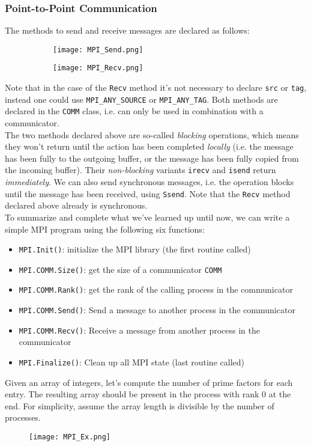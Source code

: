 \documentclass[main]{subfiles}
\begin{document}
\subsubsection{Point-to-Point Communication}
The methods to send and receive messages are declared as follows:
\begin{figure}[H]
    \centering
    \begin{subfigure}{.5\textwidth}
        \centering
        \texttt{[image: MPI\_Send.png]}
    \end{subfigure}%
    \begin{subfigure}{.5\textwidth}
        \centering
        \texttt{[image: MPI\_Recv.png]}
    \end{subfigure}
\end{figure}
Note that in the case of the \texttt{Recv} method it's not necessary to declare \texttt{src} or \texttt{tag}, instead one could use \texttt{MPI\_ANY\_SOURCE} or \texttt{MPI\_ANY\_TAG}. Both methods are declared in the \texttt{COMM} class, i.e. can only be used in combination with a communicator.\\[3mm]
The two methods declared above are so-called \textit{blocking} operations, which means they won't return until the action has been completed \textit{locally} (i.e. the message has been fully to the outgoing buffer, or the message has been fully copied from the incoming buffer). Their \textit{non-blocking} variants \texttt{irecv} and \texttt{isend} return \textit{immediately}. We can also send synchronous messages, i.e. the operation blocks until the message has been received, using \texttt{Ssend}. Note that the \texttt{Recv} method declared above already is synchronous.\\[3mm]
To summarize and complete what we've learned up until now, we can write a simple MPI program using the following six functions:
\begin{itemize}
    \item \texttt{MPI.Init()}: initialize the MPI library (the first routine called)
    \item \texttt{MPI.COMM.Size()}: get the size of a communicator \texttt{COMM}
    \item \texttt{MPI.COMM.Rank()}: get the rank of the calling process in the communicator
    \item \texttt{MPI.COMM.Send()}: Send a message to another process in the communicator
    \item \texttt{MPI.COMM.Recv()}: Receive a message from another process in the communicator
    \item \texttt{MPI.Finalize()}: Clean up all MPI state (last routine called)
\end{itemize}
\begin{example}
    Given an array of integers, let's compute the number of prime factors for each entry. The resulting array should be present in the process with rank 0 at the end. For simplicity, assume the array length is divisible by the number of processes.
    \begin{figure}[H]
        \centering
        \texttt{[image: MPI\_Ex.png]}
    \end{figure}
\end{example}
\end{document}
